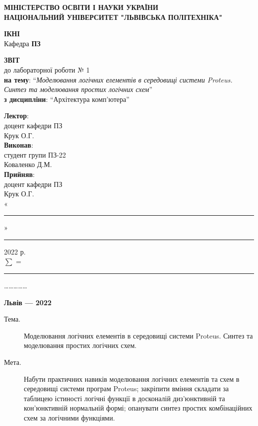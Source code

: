 \documentclass{article}
\newcommand\subject{Архітектура комп'ютера}
\newcommand\lecturer{доцент кафедри ПЗ\\Крук О.Г.}
\newcommand\teacher{доцент кафедри ПЗ\\Крук О.Г.}
\newcommand\mygroup{ПЗ-22}
\newcommand\lab{1}
\newcommand\theme{Моделювання логічних елементів в середовищі системи Proteus. Синтез та моделювання простих логічних схем}
\newcommand\purpose{Набути практичних навиків моделювання логічних елементів та схем в середовищі системи програм Proteus; закріпити вміння складати за таблицею істиності логічні функції в досконалій диз'юнктивній та кон'юнктивній нормальній формі; опанувати синтез простих комбінаційних схем за логічними функціями}
\begin{document}
\begin{normalsize}
	\begin{titlepage}
		\thispagestyle{empty}
		\begin{center}
			\textbf{МІНІСТЕРСТВО ОСВІТИ І НАУКИ УКРАЇНИ\\
				НАЦІОНАЛЬНИЙ УНІВЕРСИТЕТ "ЛЬВІВСЬКА ПОЛІТЕХНІКА"}
		\end{center}
		\begin{flushright}
			\textbf{ІКНІ}\\
			Кафедра \textbf{ПЗ}
		\end{flushright}
		\vspace{200pt}
		\begin{center}
			\textbf{ЗВІТ}\\
			\vspace{10pt}
			до лабораторної роботи № \lab\\
			\textbf{на тему}: “\textit{\theme}”\\
			\textbf{з дисципліни}: “\subject”
		\end{center}
		\vspace{112pt}
		\begin{flushright}
			
			\textbf{Лектор}:\\
			\lecturer\\
			\vspace{28pt}
			\textbf{Виконав}:\\
			
			студент групи \mygroup\\
			Коваленко Д.М.\\
			\vspace{28pt}
			\textbf{Прийняв}:\\
			
			\teacher\\
			
			\vspace{28pt}
			«\rule{1cm}{0.15mm}» \rule{1.5cm}{0.15mm} 2022 р.\\
			$\sum$ = \rule{1cm}{0.15mm}……………\\
			
		\end{flushright}
		\vspace{\fill}
		\begin{center}
			\textbf{Львів — 2022}
		\end{center}
	\end{titlepage}
		
	\begin{description}
		\item[Тема.] \theme.
		\item[Мета.] \purpose.
	\end{description}


\end{normalsize}
\end{document}
